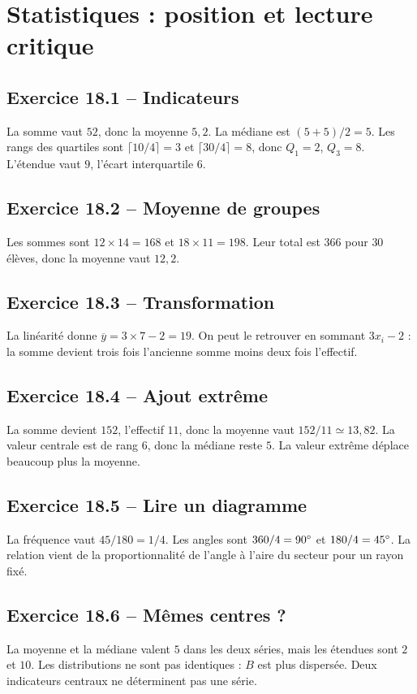\chapter{Statistiques : position et lecture critique}
\section*{Exercice 18.1 -- Indicateurs}
La somme vaut $52$, donc la moyenne $5{,}2$. La médiane est $(5+5)/2=5$. Les rangs des quartiles sont $\lceil10/4\rceil=3$ et $\lceil30/4\rceil=8$, donc $Q_1=2$, $Q_3=8$. L'étendue vaut $9$, l'écart interquartile $6$.

\section*{Exercice 18.2 -- Moyenne de groupes}
Les sommes sont $12\times14=168$ et $18\times11=198$. Leur total est $366$ pour $30$ élèves, donc la moyenne vaut $12{,}2$.

\section*{Exercice 18.3 -- Transformation}
La linéarité donne $\overline y=3\times7-2=19$. On peut le retrouver en sommant $3x_i-2$ : la somme devient trois fois l'ancienne somme moins deux fois l'effectif.

\section*{Exercice 18.4 -- Ajout extrême}
La somme devient $152$, l'effectif $11$, donc la moyenne vaut $152/11\simeq13{,}82$. La valeur centrale est de rang $6$, donc la médiane reste $5$. La valeur extrême déplace beaucoup plus la moyenne.

\section*{Exercice 18.5 -- Lire un diagramme}
La fréquence vaut $45/180=1/4$. Les angles sont $360/4=90^{\circ}$ et $180/4=45^{\circ}$. La relation vient de la proportionnalité de l'angle à l'aire du secteur pour un rayon fixé.

\section*{Exercice 18.6 -- Mêmes centres ?}
La moyenne et la médiane valent $5$ dans les deux séries, mais les étendues sont $2$ et $10$. Les distributions ne sont pas identiques : $B$ est plus dispersée. Deux indicateurs centraux ne déterminent pas une série.
